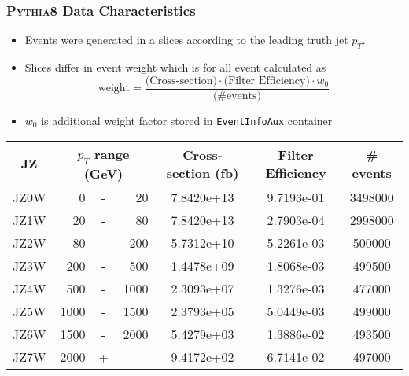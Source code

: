 \documentclass[compress]{beamer}
\newcommand{\pt}{p_{T}}
\begin{document}
\begin{frame}
\frametitle{\textsc{Pythia8} Data Characteristics}
\begin{itemize}
  \item Events were generated in a slices according to the leading truth
      jet $\pt$.
  \item Slices differ in event weight which is for all event calculated as
  \begin{equation*}
    \text{weight} = \frac{\text{(Cross-section)} \cdot \text{(Filter
      Efficiency)} \cdot w_0}{\text{(\# events)}} 
    \end{equation*}
  \item $w_0$ is additional weight factor stored in \texttt{EventInfoAux}
    container
\end{itemize}
  \small
  \begin{table}
  \centering
  \begin{tabular}{|c|rcr|c|c|c|}
    \hline 
     JZ & \multicolumn{3}{|c|}{$\pt$ range (GeV)} & Cross-section (fb) & Filter Efficiency & \# events  \\ 
    \hline
    \hline
		 JZ0W &     0 & - &    20 & 7.8420e+13 & 9.7193e-01 & 3498000 \\ 
    \hline
		 JZ1W &    20 & - &    80 & 7.8420e+13 & 2.7903e-04 & 2998000 \\
    \hline
		 JZ2W &    80 & - &   200 & 5.7312e+10 & 5.2261e-03 & 500000  \\
    \hline
		 JZ3W &   200 & - &   500 & 1.4478e+09 & 1.8068e-03 & 499500  \\
    \hline
		 JZ4W &   500 & - &  1000 & 2.3093e+07 & 1.3276e-03 & 477000  \\
    \hline
		 JZ5W &  1000 & - &  1500 & 2.3793e+05 & 5.0449e-03 & 499000  \\
    \hline
		 JZ6W &  1500 & - &  2000 & 5.4279e+03 & 1.3886e-02 & 493500  \\
    \hline
		 JZ7W &  2000 & + &       & 9.4172e+02 & 6.7141e-02 & 497000  \\
    \hline 
  \end{tabular}
\end{table}
\normalsize
\end{frame}
\end{document}
